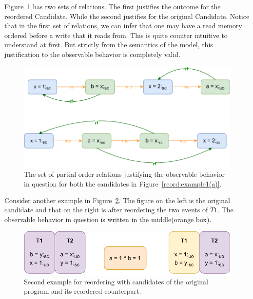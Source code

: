         Figure~\ref{reord:example1(b)} has two sets of relations. 
        The first justifies the outcome for the reordered Candidate. 
        While the second justifies for the original Candidate. 
        Notice that in the first set of relations, we can infer that one may have a read memory ordered before a write that it reads from. 
        This is quite counter intuitive to understand at first. 
        But strictly from the semantics of the model, this justification to the observable behavior is completely valid\footnotemark. 
        \begin{figure}[H]
            \centering
            \includegraphics[scale=0.7]{4.InstructionReordering/0.Intro/ReorderingExample1(b).pdf}
            \caption{The set of partial order relations justifying the observable behavior in question for both the candidates in Figure~\ref{reord:example1(a)}.} 
            \label{reord:example1(b)}
        \end{figure}

        
        Consider another example in Figure~\ref{reord:example2(a)}.
        The figure on the left is the original candidate and that on the right is after reordering the two events of $T1$.
        The observable behavior in question is written in the middle(orange box). 
        \begin{figure}[H]
            \centering
            \includegraphics[scale=0.7]{4.InstructionReordering/0.Intro/ReorderingExample2(a).pdf}
            \caption{Second example for reordering with candidates of the original program and its reordered counterpart.} 
            \label{reord:example2(a)}
        \end{figure}
   
